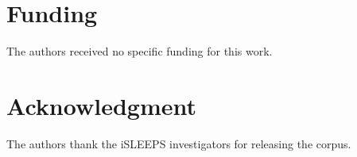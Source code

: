 \documentclass[journal]{IEEEtran}
\providecommand{\DIFaddtex}[1]{{\protect\color{blue} \sf #1}} %
\providecommand{\DIFaddend}{} %
\providecommand{\DIFadd}[1]{\texorpdfstring{\DIFaddtex{#1}}{#1}} %
\DeclareRobustCommand{\DIFaddend}{\DIFOaddend \let\includegraphics\DIFOincludegraphics} %
\begin{document}
\section*{\DIFadd{Funding}}
\DIFadd{The authors received no specific funding for this work}\DIFaddend .

\section*{Acknowledgment}
The authors thank the iSLEEPS investigators for releasing the corpus.



\end{document}
